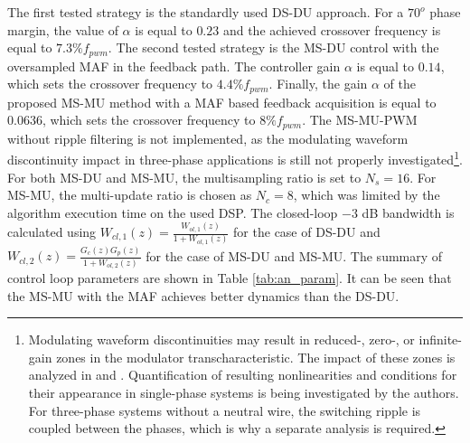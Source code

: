 \documentclass[conference]{IEEEtran}
\begin{document}
The first tested strategy is the standardly used DS-DU approach. For a $70^o$ phase margin, the value of $\alpha$ is equal to $0.23$ and the achieved crossover frequency is equal to $7.3 \% f_{pwm}$.
The second tested strategy is the MS-DU control with the oversampled MAF in the feedback path. The controller gain $\alpha$ is equal to $0.14$, which sets the crossover frequency to $4.4 \% f_{pwm}$.
Finally, the gain $\alpha$ of the proposed MS-MU method with a MAF based feedback acquisition is equal to $0.0636$, which sets the crossover frequency to $8 \%  f_{pwm}$. The MS-MU-PWM without ripple filtering is not implemented, as the modulating waveform discontinuity impact in three-phase applications is still not properly investigated\footnote{Modulating waveform discontinuities may result in reduced-, zero-, or infinite-gain zones in the modulator transcharacteristic. The impact of these zones is analyzed in \cite{corradini2018} and \cite{Petric2021}. Quantification of resulting nonlinearities and conditions for their appearance in single-phase systems is being investigated by the authors. For three-phase systems without a neutral wire, the switching ripple is coupled between the phases, which is why a separate analysis is required.}. 
For both MS-DU and MS-MU, the multisampling ratio is set to $N_s = 16$. For MS-MU, the multi-update ratio is chosen as $N_c = 8$, which was limited by the algorithm execution time on the used DSP.
The closed-loop $-3$ dB bandwidth is calculated using $W_{cl,1}(z) = \frac{W_{ol,1}(z)}{1+W_{ol,1}(z)}$ for the case of DS-DU and $W_{cl,2}(z) = \frac{G_c(z) G_p(z)}{1+W_{ol,2}(z)}$ for the case of MS-DU and MS-MU. The summary of control loop parameters are shown in Table \ref{tab:an_param}. It can be seen that the MS-MU with the MAF achieves better dynamics than the DS-DU.
\end{document}
